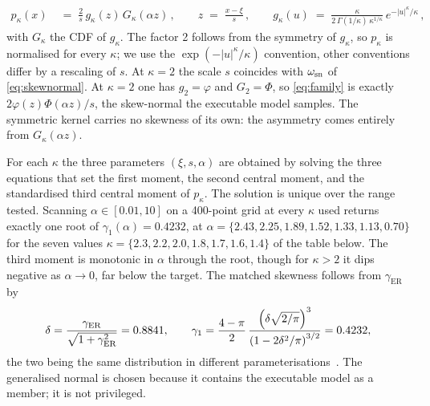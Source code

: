 \documentclass[11pt,a4paper]{article}
\begin{document}
\begin{align}
    p_\kappa(x)\;&=\;\frac{2}{s}\,g_\kappa(z)\,G_\kappa(\alpha z)\,,\qquad 
    z\;=\;\frac{x-\xi}{s}\,,\qquad 
    g_\kappa(u)\;=\;\frac{\kappa}{2\,\Gamma(1/\kappa)\,\kappa^{1/\kappa}}\,e^{-|u|^\kappa/\kappa}\,,
\label{eq:family}
\end{align}
with \(G_\kappa\) the CDF of \(g_\kappa\). The factor 2 follows from the
symmetry of \(g_\kappa\), so \(p_\kappa\) is normalised for every
\(\kappa\); we use the \(\exp(-|u|^\kappa/\kappa)\) convention, other
conventions differ by a rescaling of \(s\). At \(\kappa=2\) the scale
\(s\) coincides with \(\omega_{\rm sn}\) of \cref{eq:skewnormal}. At
\(\kappa=2\) one has \(g_2=\varphi\) and \(G_2=\Phi\), so
\cref{eq:family} is exactly \(2\varphi(z)\Phi(\alpha z)/s\), the
skew-normal the executable model samples. The symmetric kernel carries
no skewness of its own: the asymmetry comes entirely from
\(G_\kappa(\alpha z)\).

For each \(\kappa\) the three parameters \((\xi,s,\alpha)\) are obtained
by solving the three equations that set the first moment, the second
central moment, and the standardised third central moment of
\(p_\kappa\). The solution is unique over the range tested. Scanning
\(\alpha\in[0.01,10]\) on a 400-point grid at every \(\kappa\) used returns
exactly one root of \(\gamma_1(\alpha)=0.4232\), at
\(\alpha=\{2.43,2.25,1.89,1.52,1.33,1.13,0.70\}\) for the seven values
\(\kappa=\{2.3,2.2,2.0,1.8,1.7,1.6,1.4\}\) of the table below. The third moment is
monotonic in \(\alpha\) through the root, though for \(\kappa>2\) it dips
negative as \(\alpha\to0\), far below the target. The matched
skewness follows from \(\gamma_\mathrm{ER}\) by
\begin{align}
\delta=\frac{\gamma_{\rm ER}}{\sqrt{1+\gamma_{\rm ER}^{2}}}=0.8841,
\qquad
\gamma_1=\frac{4-\pi}{2}\,
\frac{\left(\delta\sqrt{2/\pi}\right)^{3}}{\left(1-2\delta^{2}/\pi\right)^{3/2}}=0.4232 ,
\label{eq:skewconv}
\end{align}
the two being the same distribution in different
parameterisations~\cite{Azzalini}. The generalised normal is chosen
because it contains the executable model as a member; it is not
privileged.
\end{document}
